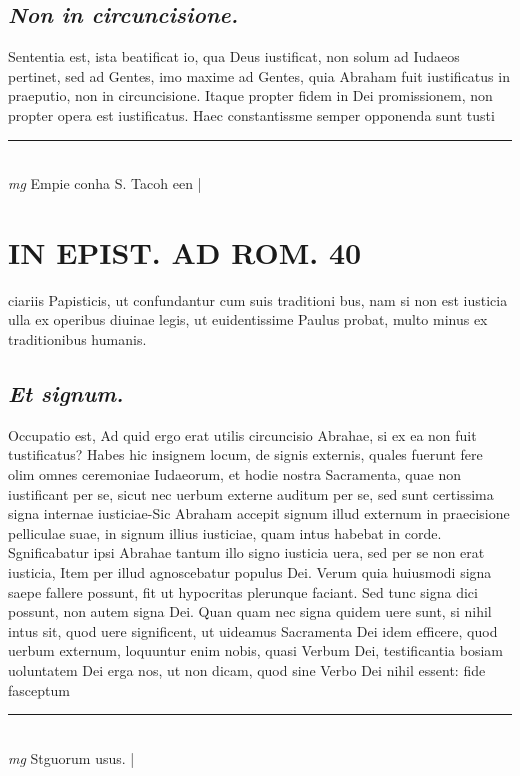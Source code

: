 \documentclass{article}
\begin{document}
\begin{pages}
\subsection*{\textit{Non in circuncisione. }}\pstart Sententia est, ista beatificat io, qua Deus iustificat, non solum ad Iudaeos pertinet, sed ad Gentes, imo maxime ad Gentes, quia Abraham fuit iustificatus in praeputio, non in circuncisione. Itaque propter fidem in Dei promissionem, non propter opera est iustificatus. Haec constantissme semper opponenda sunt tusti  \pend
\vspace{0.5cm}\noindent
\vspace{0.2cm}\rule{1cm}{0.2pt}\\ 
\hspace{0.2cm}\textit{mg}
\footnotesize Empie conha S. Tacoh een 
\normalsize| 
\section*{IN EPIST. AD ROM.  40 }
\marginpar{[ p.]}\pstart ciariis Papisticis, ut confundantur cum suis traditioni bus, nam si non est iusticia ulla ex operibus diuinae legis, ut euidentissime Paulus probat, multo minus ex traditionibus humanis.   \pend
{}
{}
\subsection*{\textit{Et signum. }}\pstart Occupatio est, Ad quid ergo erat utilis circuncisio Abrahae, si ex ea non fuit tustificatus? Habes hic insignem locum, de signis externis, quales fuerunt fere olim omnes ceremoniae Iudaeorum, et hodie nostra Sacramenta, quae non iustificant per se, sicut nec uerbum externe auditum per se, sed sunt certissima signa internae iusticiae-Sic Abraham accepit signum illud externum in praecisione pelliculae suae, in signum illius iusticiae, quam intus habebat in corde. Sgnificabatur ipsi Abrahae tantum illo signo iusticia uera, sed per se non erat iusticia, Item per illud agnoscebatur populus Dei. Verum quia huiusmodi signa saepe fallere possunt, fit ut hypocritas plerunque faciant. Sed tunc signa dici possunt, non autem signa Dei. Quan quam nec signa quidem uere sunt, si nihil intus sit, quod uere significent, ut uideamus Sacramenta Dei idem efficere, quod uerbum externum, loquuntur enim nobis, quasi Verbum Dei, testificantia bosiam uoluntatem Dei erga nos, ut non dicam, quod sine Verbo Dei nihil essent: fide fasceptum  \pend
\vspace{0.5cm}\noindent
\vspace{0.2cm}\rule{1cm}{0.2pt}\\ 
\hspace{0.2cm}\textit{mg}
\footnotesize Stguorum usus. 
\normalsize| 

\end{pages}
\end{document}
